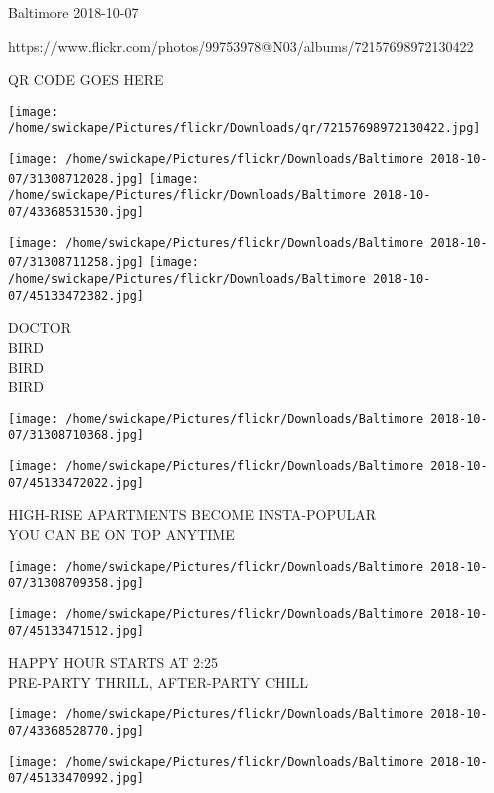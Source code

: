 \documentclass[10pt,letterpaper]{article}
\begin{document}
Baltimore 2018-10-07

https://www.flickr.com/photos/99753978@N03/albums/72157698972130422

QR CODE GOES HERE

\texttt{[image: /home/swickape/Pictures/flickr/Downloads/qr/72157698972130422.jpg]}
\pagebreak

\texttt{[image: /home/swickape/Pictures/flickr/Downloads/Baltimore 2018-10-07/31308712028.jpg]}
\texttt{[image: /home/swickape/Pictures/flickr/Downloads/Baltimore 2018-10-07/43368531530.jpg]}

\texttt{[image: /home/swickape/Pictures/flickr/Downloads/Baltimore 2018-10-07/31308711258.jpg]}
\texttt{[image: /home/swickape/Pictures/flickr/Downloads/Baltimore 2018-10-07/45133472382.jpg]}

DOCTOR\\
BIRD\\
BIRD\\
BIRD\\
\pagebreak

\texttt{[image: /home/swickape/Pictures/flickr/Downloads/Baltimore 2018-10-07/31308710368.jpg]}

\vspace{0.25in}
\texttt{[image: /home/swickape/Pictures/flickr/Downloads/Baltimore 2018-10-07/45133472022.jpg]}

HIGH{-}RISE APARTMENTS BECOME INSTA{-}POPULAR\\
YOU CAN BE ON TOP ANYTIME\\
\pagebreak

\texttt{[image: /home/swickape/Pictures/flickr/Downloads/Baltimore 2018-10-07/31308709358.jpg]}

\vspace{0.25in}
\texttt{[image: /home/swickape/Pictures/flickr/Downloads/Baltimore 2018-10-07/45133471512.jpg]}

HAPPY HOUR STARTS AT 2:25\\
PRE{-}PARTY THRILL, AFTER{-}PARTY CHILL\\
\pagebreak

\texttt{[image: /home/swickape/Pictures/flickr/Downloads/Baltimore 2018-10-07/43368528770.jpg]}

\vspace{0.25in}
\texttt{[image: /home/swickape/Pictures/flickr/Downloads/Baltimore 2018-10-07/45133470992.jpg]}
\end{document}
